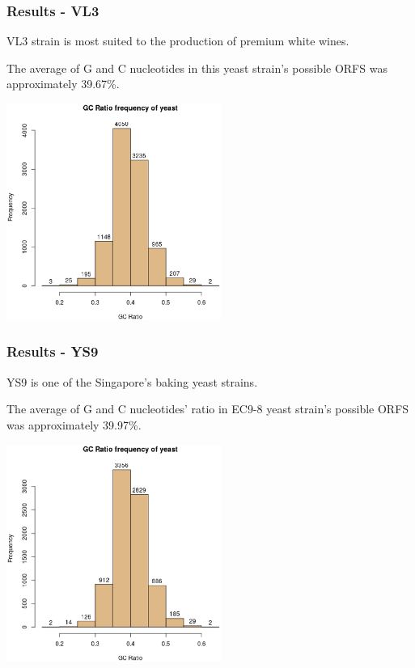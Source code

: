 \documentclass{beamer}
\begin{document}

\begin{frame}
\frametitle{Results - VL3}

VL3 strain is most suited to the production of premium white wines.

The average of G and C nucleotides in this yeast strain's possible ORFS was approximately 39.67\%.
\begin{minipage}{0.5\textwidth}
\includegraphics[width=70mm]{images/VL3_AWRI_2011_AEJS01000000.eps}
\end{minipage}
\end{frame}


\begin{frame}
\frametitle{Results - YS9}

YS9 is one of the Singapore's baking yeast strains.

The average of G and C nucleotides' ratio in EC9-8 yeast strain's possible ORFS was approximately 39.97\%.

\begin{minipage}{0.5\textwidth}
\includegraphics[width=70mm]{images/YS9_Stanford_2014_JRIB00000000.eps}
\end{minipage}
\end{frame}
\end{document}
